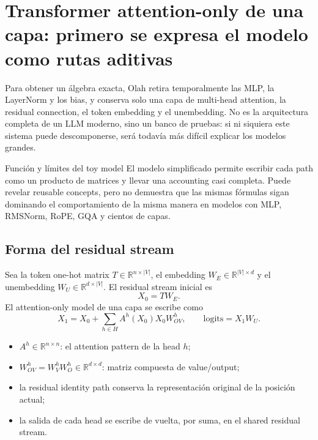 \section{Transformer attention-only de una capa: primero se expresa el modelo como rutas aditivas}

Para obtener un álgebra exacta, Olah retira temporalmente las MLP, la LayerNorm y los bias, y conserva solo una capa de multi-head attention, la residual connection, el token embedding y el unembedding. No es la arquitectura completa de un LLM moderno, sino un banco de pruebas: si ni siquiera este sistema puede descomponerse, será todavía más difícil explicar los modelos grandes.


\begin{warningbox}{Función y límites del toy model}
El modelo simplificado permite escribir cada path como un producto de matrices y llevar una accounting casi completa. Puede revelar reusable concepts, pero no demuestra que las mismas fórmulas sigan dominando el comportamiento de la misma manera en modelos con MLP, RMSNorm, RoPE, GQA y cientos de capas.
\end{warningbox}

\subsection{Forma del residual stream}

Sea la token one-hot matrix $T\in\mathbb{R}^{n\times |V|}$, el embedding $W_E\in\mathbb{R}^{|V|\times d}$ y el unembedding $W_U\in\mathbb{R}^{d\times |V|}$. El residual stream inicial es
\[
X_0=T W_E.
\]
El attention-only model de una capa se escribe como
\[
X_1=X_0+\sum_{h\in H}A^h(X_0)X_0W_{OV}^h,
\qquad
\mathrm{logits}=X_1W_U.
\]

\begin{itemize}
  \item $A^h\in\mathbb{R}^{n\times n}$: el attention pattern de la head $h$;
  \item $W_{OV}^h=W_V^hW_O^h\in\mathbb{R}^{d\times d}$: matriz compuesta de value/output;
  \item la residual identity path conserva la representación original de la posición actual;
  \item la salida de cada head se escribe de vuelta, por suma, en el shared residual stream.
\end{itemize}

